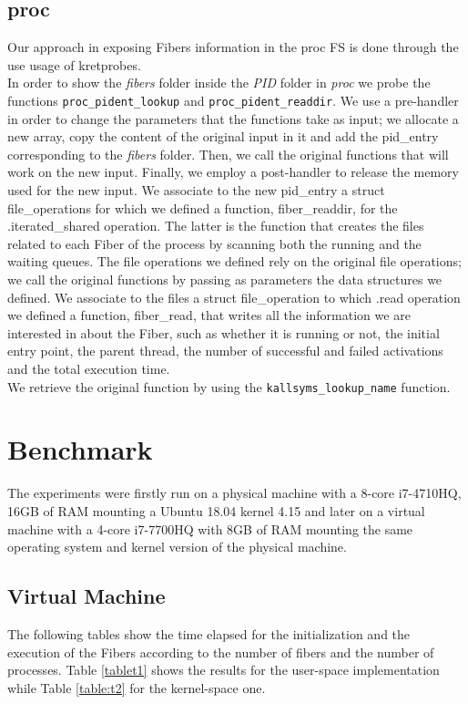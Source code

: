 \documentclass[11pt]{article}
\begin{document}
\subsection{proc}
Our approach in exposing Fibers information in the proc FS is done through the use usage of kretprobes.\\ %
In order to show the \textit{fibers} folder inside the \textit{PID} folder in \textit{proc} we probe the functions \texttt{proc\_pident\_lookup} and \texttt{proc\_pident\_readdir}. We use a pre-handler in order to change the parameters that the functions take as input; we allocate a new array, copy the content of the original input in it and add the pid\_entry corresponding to the \textit{fibers} folder. Then, we call the original functions that will work on the new input. Finally, we employ a post-handler to release the memory used for the new input. We associate to the new pid\_entry a struct file\_operations for which we defined a function, fiber\_readdir, for the .iterated\_shared operation. The latter is the function that creates the files related to each Fiber of the process by scanning both the running and the waiting queues. The file operations we defined rely on the original file operations; we call the original functions by passing as parameters the data structures we defined. We associate to the files a struct file\_operation to which .read operation we defined a function, fiber\_read, that writes all the information we are interested in about the Fiber, such as whether it is running or not, the initial entry point, the parent thread, the number of successful and failed activations and the total execution time.\\
We retrieve the original function by using the \texttt{kallsyms\_lookup\_name} function.

\section{Benchmark}
The experiments were firstly run on a physical machine with a 8-core i7-4710HQ, 16GB of RAM mounting a Ubuntu 18.04 kernel 4.15 and later on a virtual machine with a 4-core i7-7700HQ with 8GB of RAM mounting the same operating system and kernel version of the physical machine.


\subsection{Virtual Machine}
The following tables show the time elapsed for the initialization and the execution of the Fibers according to the number of fibers and the number of processes. Table \ref{tablet1} shows the results for the user-space implementation while Table \ref{table:t2} for the kernel-space one.
\end{document}
